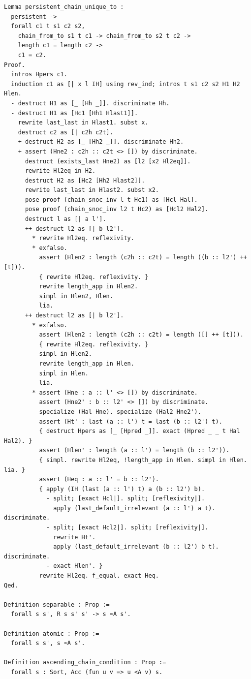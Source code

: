 \begin{latin}
\begin{verbatim}
Lemma persistent_chain_unique_to :
  persistent ->
  forall c1 t s1 c2 s2,
    chain_from_to s1 t c1 -> chain_from_to s2 t c2 ->
    length c1 = length c2 ->
    c1 = c2.
Proof.
  intros Hpers c1.
  induction c1 as [| x l IH] using rev_ind; intros t s1 c2 s2 H1 H2 Hlen.
  - destruct H1 as [_ [Hh _]]. discriminate Hh.
  - destruct H1 as [Hc1 [Hh1 Hlast1]].
    rewrite last_last in Hlast1. subst x.
    destruct c2 as [| c2h c2t].
    + destruct H2 as [_ [Hh2 _]]. discriminate Hh2.
    + assert (Hne2 : c2h :: c2t <> []) by discriminate.
      destruct (exists_last Hne2) as [l2 [x2 Hl2eq]].
      rewrite Hl2eq in H2.
      destruct H2 as [Hc2 [Hh2 Hlast2]].
      rewrite last_last in Hlast2. subst x2.
      pose proof (chain_snoc_inv l t Hc1) as [Hcl Hal].
      pose proof (chain_snoc_inv l2 t Hc2) as [Hcl2 Hal2].
      destruct l as [| a l'].
      ++ destruct l2 as [| b l2'].
        * rewrite Hl2eq. reflexivity.
        * exfalso.
          assert (Hlen2 : length (c2h :: c2t) = length ((b :: l2') ++ [t])).
          { rewrite Hl2eq. reflexivity. }
          rewrite length_app in Hlen2.
          simpl in Hlen2, Hlen.
          lia.
      ++ destruct l2 as [| b l2'].
        * exfalso.
          assert (Hlen2 : length (c2h :: c2t) = length ([] ++ [t])).
          { rewrite Hl2eq. reflexivity. }
          simpl in Hlen2.
          rewrite length_app in Hlen.
          simpl in Hlen.
          lia.
        * assert (Hne : a :: l' <> []) by discriminate.
          assert (Hne2' : b :: l2' <> []) by discriminate.
          specialize (Hal Hne). specialize (Hal2 Hne2').
          assert (Ht' : last (a :: l') t = last (b :: l2') t).
          { destruct Hpers as [_ [Hpred _]]. exact (Hpred _ _ t Hal Hal2). }
          assert (Hlen' : length (a :: l') = length (b :: l2')).
          { simpl. rewrite Hl2eq, !length_app in Hlen. simpl in Hlen. lia. }
          assert (Heq : a :: l' = b :: l2').
          { apply (IH (last (a :: l') t) a (b :: l2') b).
            - split; [exact Hcl|]. split; [reflexivity|].
              apply (last_default_irrelevant (a :: l') a t). discriminate.
            - split; [exact Hcl2|]. split; [reflexivity|].
              rewrite Ht'.
              apply (last_default_irrelevant (b :: l2') b t). discriminate.
            - exact Hlen'. }
          rewrite Hl2eq. f_equal. exact Heq.
Qed.

Definition separable : Prop := 
  forall s s', R s s' s' -> s ≈A s'.

Definition atomic : Prop := 
  forall s s', s ≈A s'.

Definition ascending_chain_condition : Prop :=
  forall s : Sort, Acc (fun u v => u <A v) s.


\end{verbatim}
\end{latin}
